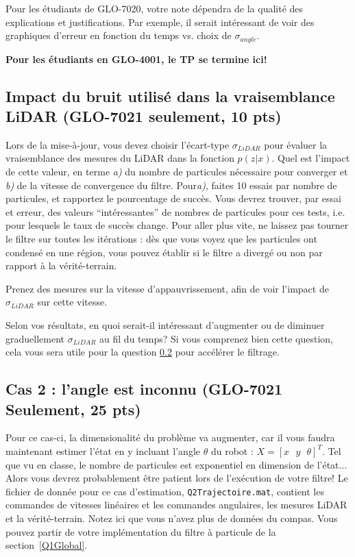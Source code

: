 \documentclass[12pt]{article}
\begin{document}
Pour les étudiants de GLO-7020, votre note dépendra de la qualité des explications et justifications. Par exemple, il serait intéressant de voir des graphiques d'erreur en fonction du temps vs. choix de  $\sigma_{angle}$.

\begin{center}
\textbf{Pour les étudiants en GLO-4001, le TP se termine ici!}
\end{center}

\newpage
\subsection{Impact du bruit utilisé dans la vraisemblance LiDAR (GLO-7021 seulement, 10 pts)}
\label{ImpactLidarBruit}
Lors de la mise-à-jour, vous devez choisir l'écart-type $\sigma_{LiDAR}$ pour évaluer la vraisemblance des mesures du LiDAR dans la fonction $p(z|x)$. Quel est l'impact de cette valeur, en terme \emph{a)} du nombre de particules nécessaire pour converger et \emph{b)} de la vitesse de convergence du filtre. Pour\emph{a)}, faites 10 essais par nombre de particules, et rapportez le pourcentage de succès. Vous devrez trouver, par essai et erreur, des valeurs ``intéressantes'' de nombres de particules pour ces tests, i.e. pour lesquels le taux de succès change. Pour aller plus vite, ne laissez pas tourner le filtre sur toutes les itérations : dès que vous voyez que les particules ont condensé en une région, vous pouvez établir si le filtre a divergé ou non par rapport à la vérité-terrain.

Prenez des mesures sur la vitesse d'appauvrissement, afin de voir l'impact de $\sigma_{LiDAR}$ sur cette vitesse.

 Selon vos résultats, en quoi serait-il intéressant d'augmenter ou de diminuer graduellement $\sigma_{LiDAR}$ au fil du temps? Si vous comprenez bien cette question, cela vous sera utile pour la question \ref{Q2Global} pour accélérer le filtrage.

\subsection{Cas 2 : l'angle est inconnu (GLO-7021 Seulement, 25 pts)}
\label{Q2Global}
Pour ce cas-ci, la dimensionalité du problème va augmenter, car il vous faudra maintenant estimer l'état en y incluant l'angle $\theta$ du robot : $X=[x \mbox{ } y \mbox{ } \theta]^T$. Tel que vu en classe, le nombre de particules est exponentiel en dimension de l'état... Alors vous devrez probablement être patient lors de l'exécution de votre filtre! Le fichier de donnée pour ce cas d'estimation, \texttt{Q2Trajectoire.mat}, contient les commandes de vitesses linéaires et les commandes angulaires, les mesures LiDAR et la vérité-terrain. Notez ici que vous n'avez plus de données du compas. Vous pouvez partir de votre implémentation du filtre à particule de la section~\ref{Q1Global}.
\end{document}
